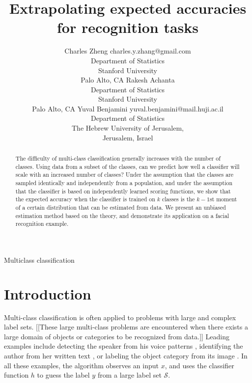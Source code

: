\documentclass[twoside,11pt]{article}
\begin{document}
\title{Extrapolating expected accuracies for recognition tasks}


\author{\name Charles Zheng \email charles.y.zhang@gmail.com \\
       \addr Department of Statistics\\
       Stanford University\\
       Palo Alto, CA 
       \AND
       \name Rakesh Achanta \email  \\
       \addr Department of Statistics\\
       Stanford University\\
       Palo Alto, CA 
       \AND
       \name Yuval Benjamini \email yuval.benjamini@mail.huji.ac.il \\
       \addr Department of Statistics\\
       The Hebrew University of Jerusalem,\\
       Jerusalem, Israel}

\maketitle

\begin{abstract}%
The difficulty of multi-class classification generally increases with
the number of classes.  Using data from a subset of the classes, can
we predict how well a classifier will scale with an increased number
of classes?  Under the assumption that the classes are sampled identically and independently from a population, and under the assumption that the classifier is based on independently learned scoring functions, we show that the expected accuracy when the classifier is trained on $k$ classes is the $k-1$st
moment of a certain distribution that can be
estimated from data.  We present an unbiased estimation method based on the theory, and demonstrate its application on a facial recognition example.
\end{abstract}

\begin{keywords}
Multiclass classification
\end{keywords}
\section{Introduction}\label{sec:recog_tasks}

Multi-class classification is often applied to problems with large and complex label sets. 
[[These large multi-class problems are encountered when there exists a large domain of objects or categories to be recognized from data.]]
Leading examples include detecting the speaker from his voice patterns \citep{togneri2011overview}, 
identifying the author from her written text \citep{stamatatos2014overview}, or labeling the object 
category from its image \citep{duygulu2002object,deng2010does,oquab2014learning}. 
In all these examples, 
the algorithm observes an input $x$, and uses the classifier function $h$ to guess the label $y$ from a large label set $\mathcal{S}$. 
\end{document}
